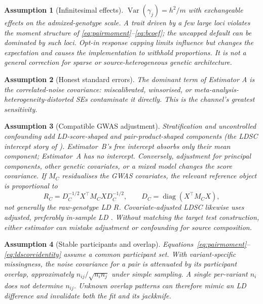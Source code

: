 \documentclass[11pt,a4paper]{article}
\newtheorem{assumption}{Assumption}
\begin{document}
\begin{assumption}[Infinitesimal effects]\label{ass:infinitesimal}
$\operatorname{Var}(\gamma_j) = h^2/m$ with exchangeable effects on the
admixed-genotype scale. A trait driven by a few large loci violates the
moment structure of \eqref{eq:pairmoment}--\eqref{eq:bcoef}; the uncapped
default can be dominated by such loci. Opt-in response capping limits
influence but changes the expectation and causes the implementation to
withhold proportions. It is not a general correction for sparse or
source-heterogeneous genetic architecture.
\end{assumption}

\begin{assumption}[Honest standard errors]\label{ass:se}
The dominant term of Estimator A is the correlated-noise covariance:
miscalibrated, winsorised, or meta-analysis-heterogeneity-distorted SEs
contaminate it directly. This is the channel's greatest sensitivity.
\end{assumption}

\begin{assumption}[Compatible GWAS adjustment]\label{ass:confound}
Stratification and uncontrolled confounding add LD-score-shaped and
pair-product-shaped components (the LDSC intercept story of
\citet{bulik2015ldsc}). Estimator~B's free intercept absorbs only their mean
component; Estimator~A has no intercept.
Conversely, adjustment for principal components, other genetic covariates,
or a mixed model changes the score covariance. If $M_C$ residualises the
GWAS covariates, the relevant reference object is proportional to
\begin{equation}\label{eq:covadjustedld}
  R_C
  = D_C^{-1/2}X^{\top}M_CX D_C^{-1/2},
  \qquad
  D_C=\operatorname{diag}(X^{\top}M_CX),
\end{equation}
not generally the raw-genotype LD $R$. Covariate-adjusted LDSC likewise uses
adjusted, preferably in-sample LD \citep{luo2021covldsc}. Without matching
the target test construction, either estimator can mistake adjustment or
confounding for source composition.
\end{assumption}

\begin{assumption}[Stable participants and overlap]\label{ass:overlap}
Equations~\eqref{eq:pairmoment}--\eqref{eq:ldscoreidentity} assume a common
participant set. With variant-specific missingness, the noise covariance for
a pair is attenuated by its participant overlap, approximately
$n_{ij}/\sqrt{n_i n_j}$ under simple sampling. A single per-variant $n_i$
does not determine $n_{ij}$. Unknown overlap patterns can therefore mimic an
LD difference and invalidate both the fit and its jackknife.
\end{assumption}
\end{document}
